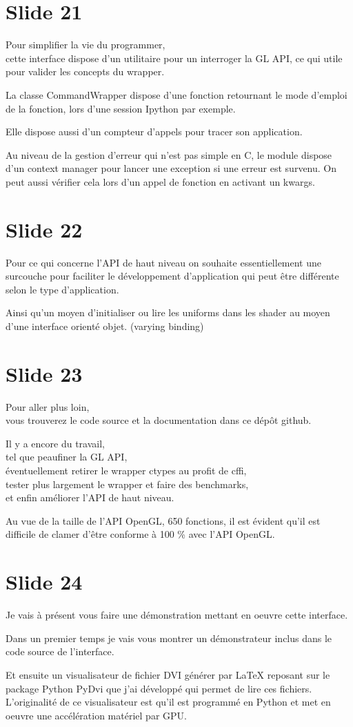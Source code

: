 \documentclass[12pt]{article}
\begin{document}
\section{Slide 21}

Pour simplifier la vie du programmer, \\
cette interface dispose d'un utilitaire pour un interroger la GL API, ce qui utile pour valider les
concepts du wrapper.

La classe CommandWrapper dispose d'une fonction retournant le mode d'emploi de la fonction, lors d'une
session Ipython par exemple.

Elle dispose aussi d'un compteur d'appels pour tracer son application.

Au niveau de la gestion d'erreur qui n'est pas simple en C, le module dispose d'un context manager
pour lancer une exception si une erreur est survenu. On peut aussi vérifier cela lors d'un appel de
fonction en activant un kwargs.

\section{Slide 22}

Pour ce qui concerne l'API de haut niveau on souhaite essentiellement une surcouche pour faciliter
le développement d'application qui peut être différente selon le type d'application.

Ainsi qu'un moyen d'initialiser ou lire les uniforms dans les shader au moyen d'une interface
orienté objet. (varying binding)

\section{Slide 23}

Pour aller plus loin, \\
vous trouverez le code source et la documentation dans ce dépôt github.

Il y a encore du travail, \\
tel que peaufiner la GL API, \\
éventuellement retirer le wrapper ctypes au profit de cffi, \\
tester plus largement le wrapper et faire des benchmarks, \\
et enfin améliorer l'API de haut niveau.

Au vue de la taille de l'API OpenGL, 650 fonctions, il est évident qu'il est difficile de clamer
d'être conforme à 100 \% avec l'API OpenGL.

\section{Slide 24}

Je vais à présent vous faire une démonstration mettant en oeuvre cette interface.

Dans un premier temps je vais vous montrer un démonstrateur inclus dans le code source de l'interface.

Et ensuite un visualisateur de fichier DVI générer par LaTeX reposant sur le package Python PyDvi
que j'ai développé qui permet de lire ces fichiers. L'originalité de ce visualisateur est qu'il est
programmé en Python et met en oeuvre une accélération matériel par GPU.
\end{document}
